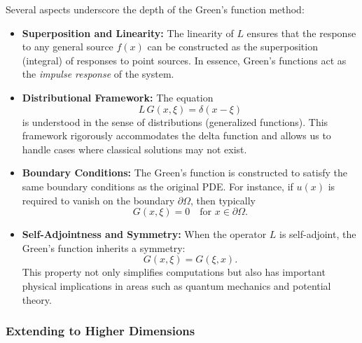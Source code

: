 \noindent
Several aspects underscore the depth of the Green's function method:
\begin{itemize}
    \item \textbf{Superposition and Linearity:}  
    The linearity of \(L\) ensures that the response to any general source \(f(x)\) can be constructed as the superposition (integral) of responses to point sources. In essence, Green's functions act as the \emph{impulse response} of the system.
    
    \item \textbf{Distributional Framework:}  
    The equation
    \[
    L\,G(x,\xi)=\delta(x-\xi)
    \]
    is understood in the sense of distributions (generalized functions). This framework rigorously accommodates the delta function and allows us to handle cases where classical solutions may not exist.
    
    \item \textbf{Boundary Conditions:}  
    The Green's function is constructed to satisfy the same boundary conditions as the original PDE. For instance, if \(u(x)\) is required to vanish on the boundary \(\partial\Omega\), then typically
    \[
    G(x,\xi)=0\quad\text{for } x\in\partial\Omega.
    \]
    
    \item \textbf{Self-Adjointness and Symmetry:}  
    When the operator \(L\) is self-adjoint, the Green's function inherits a symmetry:
    \[
    G(x,\xi)=G(\xi,x).
    \]
    This property not only simplifies computations but also has important physical implications in areas such as quantum mechanics and potential theory.
\end{itemize}

\subsubsection*{Extending to Higher Dimensions}

